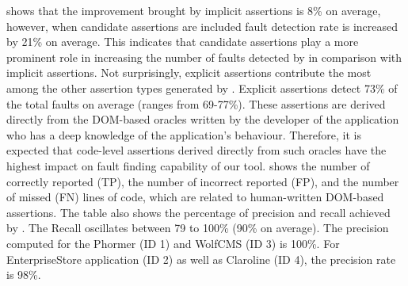  shows that the improvement brought by implicit assertions is 8\% on average, however, when candidate assertions are included fault detection rate is increased by 21\% on average. This indicates that candidate assertions play a more prominent role in increasing the number of faults detected by \tool in comparison with implicit assertions. Not surprisingly, explicit assertions contribute the most among the other assertion types generated by \tool. Explicit assertions detect 73\% of the total faults on average (ranges from 69-77\%). These assertions are derived directly from the DOM-based oracles written by the developer of the application who has a deep knowledge of the application's behaviour. Therefore, it is expected that code-level assertions derived directly from such oracles have the highest impact on fault finding capability of our tool.        
 shows the number of  correctly reported (TP), the number of incorrect reported (FP), and the number of missed (FN) \javascript lines of code, which are related to human-written DOM-based assertions. The table also shows the percentage of precision and recall achieved by \tool. The Recall oscillates between 79 to 100\% (90\% on average). The precision computed for the Phormer (ID 1) and WolfCMS (ID 3) is 100\%. For EnterpriseStore application (ID 2) as well as Claroline (ID 4), the precision rate is 98\%.

